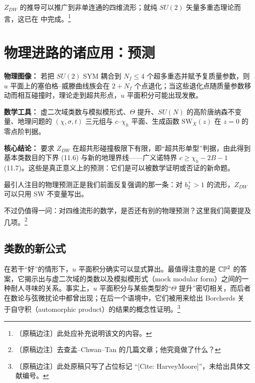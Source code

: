 $Z_{DW}$ 的推导可以推广到非单连通的四维流形；就纯 $SU(2)$ 矢量多重态理论而言，这已在 \cite{ref30,ref32} 中完成。\footnote{〔原稿边注〕此处应补充说明该文的内容。}


\section{物理进路的诸应用：预测}

\begin{keytakeaways}
\item \textbf{物理图像：} 若把 $SU(2)$ SYM 耦合到 $N_{f}\le4$ 个超多重态并赋予复质量参数，则 $u$ 平面上的塞伯格--威滕曲线族会在 $2+N_{f}$ 个点退化；当这些退化点随质量参数移动而相互碰撞时，理论走到超共形点，$u$ 平面积分可能出现发散。
\item \textbf{数学工具：} 虚二次域类数与模拟模形式、$\Theta$ 提升、$SU(N)$ 的高阶唐纳森不变量、地理问题的 $(\chi,\sigma,t)$ 三元组与 $c$--$\chi_{h}$ 平面、生成函数 $\mathrm{SW}_{X}(z)$ 在 $z=0$ 的零点阶判据。
\item \textbf{核心结论：} 要求 $Z_{DW}$ 在超共形碰撞极限下有限，即“超共形单型”判据，由此得到基本类数目的下界 (11.6) 与新的地理界线——广义诺特界 $c\ge\chi_{h}-2B-1$ (11.7)。这些是真正意义上的预测：它们是可以被数学证明或否证的新命题。
\end{keytakeaways}

最引人注目的物理预测正是我们前面反复强调的那一条：对 $b_{2}^{+}>1$ 的流形，$Z_{DW}$ 可以只用 SW 不变量写出。

不过仍值得一问：对四维流形的数学，是否还有别的物理预测？这里我们简要提及几项。\footnote{〔原稿边注〕去查孟--Chwan--Tan 的几篇文章；他究竟做了什么？}

\subsection{类数的新公式}

在若干“好”的情形下，$u$ 平面积分确实可以显式算出。最值得注意的是 $\mathbb{C}\mathbb{P}^{2}$ 的答案，它揭示出与虚二次域的类数以及模拟模形式（mock modular form）之间的一种耐人寻味的关系。事实上，$u$ 平面积分与某些类型的“$\Theta$ 提升”密切相关，而后者在数论与弦微扰论中都曾出现；在后一个语境中，它们被用来给出 Borcherds 关于自守积（automorphic product）的结果的概念性证明。\footnote{〔原稿边注〕此处原稿只写了占位标记 “[Cite: HarveyMoore]”，未给出具体文献编号。}

